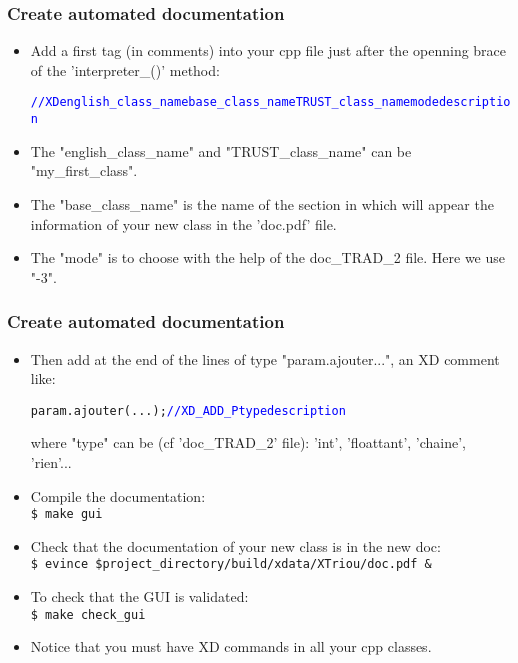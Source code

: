 \documentclass[10pt, hyperref={unicode=true,pdfusetitle, bookmarks=true,bookmarksnumbered=false,bookmarksopen=false, breaklinks=false,pdfborder={0 0 1},backref=true,colorlinks=true,linkcolor=darkblue,pageanchor, urlcolor=darkblue}]{beamer}
\begin{document}
\begin{frame}
\frametitle{Create automated documentation}
\begin{block}{}

\begin{itemize}
\item Add a first tag (in comments) into your cpp file just after the openning brace of the 'interpreter\_()' method:\\
\begin{alltt}
\textcolor{blue}{// XD english\_class\_name base\_class\_name TRUST\_class\_name mode description}
\end{alltt}
\item The "english\_class\_name" and "TRUST\_class\_name" can be "my\_first\_class".
\item The "base\_class\_name" is the name of the section in which will appear the information of your new class in the 'doc.pdf' file.
\item The "mode" is to choose with the help of the doc\_TRAD\_2 file. Here we use "-3".
\end{itemize}

\end{block}
\end{frame}
\begin{frame}
\frametitle{Create automated documentation}
\begin{block}{}

\begin{itemize}
\item Then add at the end of the lines of type "param.ajouter...", an XD comment like:\\
\begin{alltt}
param.ajouter(...);  \textcolor{blue}{// XD\_ADD\_P type description}
\end{alltt}
where "type" can be (cf 'doc\_TRAD\_2' file): 'int', 'floattant', 'chaine', 'rien'...
\item Compile the documentation:\\
\texttt{\$ make gui}
\item Check that the documentation of your new class is in the new doc:\\
\texttt{\$ evince \$project\_directory/build/xdata/XTriou/doc.pdf \&}
\item To check that the GUI is validated:\\
\texttt{\$ make check\_gui}
\item Notice that you must have XD commands in all your cpp classes.
\end{itemize}

\end{block}
\end{frame}
\end{document}
